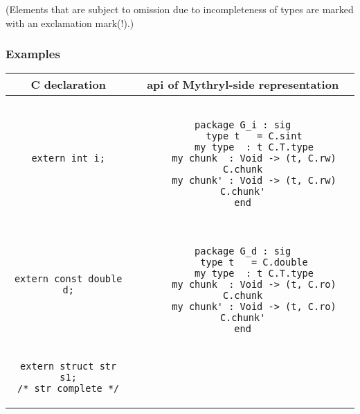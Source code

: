(Elements that are subject to omission due to incompleteness of types
are marked with an exclamation mark(!).)

\subsubsection*{Examples}

\begin{small}
\begin{center}
\begin{tabular}{c|c}
C declaration & api of Mythryl-side representation \\ \hline\hline
\begin{minipage}{2in}
\begin{verbatim}
extern int i;
\end{verbatim}
\end{minipage}
&
\begin{minipage}{4in}
\begin{verbatim}

package G_i : sig
    type t   = C.sint
    my type  : t C.T.type
    my chunk  : Void -> (t, C.rw) C.chunk
    my chunk' : Void -> (t, C.rw) C.chunk'
end

\end{verbatim}
\end{minipage}
\\ \hline
\begin{minipage}{2in}
\begin{verbatim}
extern const double d;
\end{verbatim}
\end{minipage}
&
\begin{minipage}{4in}
\begin{verbatim}

package G_d : sig
    type t   = C.double
    my type  : t C.T.type
    my chunk  : Void -> (t, C.ro) C.chunk
    my chunk' : Void -> (t, C.ro) C.chunk'
end

\end{verbatim}
\end{minipage}
\\ \hline
\begin{minipage}{2in}
\begin{verbatim}
extern struct str s1;
/* str complete */
\end{verbatim}
\end{minipage}
&
\begin{minipage}{4in}
\begin{verbatim}


\end{verbatim}
\end{minipage}
\end{tabular}
\end{center}
\end{small}
